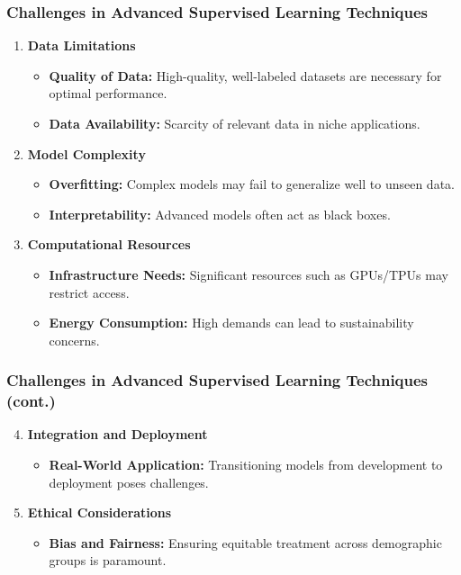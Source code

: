 \documentclass[aspectratio=169]{beamer}
\begin{document}
\begin{frame}[fragile]
    \frametitle{Challenges in Advanced Supervised Learning Techniques}
    \begin{enumerate}
        \item \textbf{Data Limitations}
        \begin{itemize}
            \item \textbf{Quality of Data:} High-quality, well-labeled datasets are necessary for optimal performance.
            \item \textbf{Data Availability:} Scarcity of relevant data in niche applications.
        \end{itemize}
        \item \textbf{Model Complexity}
        \begin{itemize}
            \item \textbf{Overfitting:} Complex models may fail to generalize well to unseen data.
            \item \textbf{Interpretability:} Advanced models often act as black boxes.
        \end{itemize}
        \item \textbf{Computational Resources}
        \begin{itemize}
            \item \textbf{Infrastructure Needs:} Significant resources such as GPUs/TPUs may restrict access.
            \item \textbf{Energy Consumption:} High demands can lead to sustainability concerns.
        \end{itemize}
    \end{enumerate}
\end{frame}

\begin{frame}[fragile]
    \frametitle{Challenges in Advanced Supervised Learning Techniques (cont.)}
    \begin{enumerate}
        \setcounter{enumi}{3} %
        \item \textbf{Integration and Deployment}
        \begin{itemize}
            \item \textbf{Real-World Application:} Transitioning models from development to deployment poses challenges.
        \end{itemize}
        \item \textbf{Ethical Considerations}
        \begin{itemize}
            \item \textbf{Bias and Fairness:} Ensuring equitable treatment across demographic groups is paramount.
        \end{itemize}
    \end{enumerate}
\end{frame}
\end{document}
